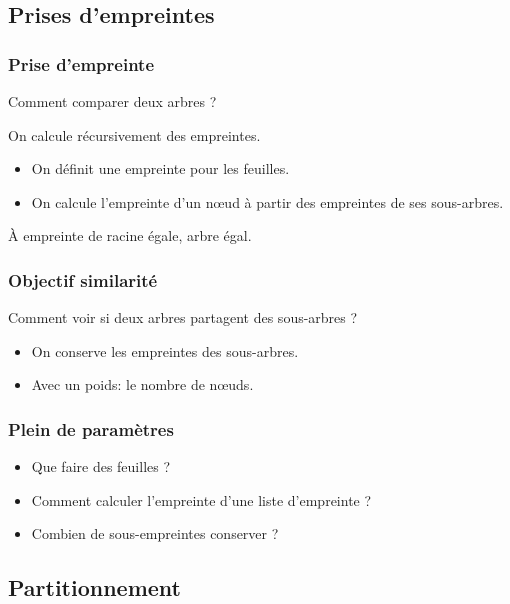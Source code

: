 \documentclass[11pt]{beamer}
\begin{document}
\subsection{Prises d'empreintes}
\begin{frame}
	\frametitle{Prise d'empreinte}
	Comment comparer deux arbres ?
	
	\pause
	
	On calcule \alert{récursivement} des empreintes.
	\pause
	
	\begin{itemize}
		\item On définit une empreinte pour les feuilles.
		\item On calcule l'empreinte d'un nœud à partir des empreintes de ses sous-arbres.
	\end{itemize}
	
	\pause
	À empreinte de racine égale, arbre égal.
	
\end{frame}

\begin{frame}
	\frametitle{Objectif similarité}
	Comment voir si deux arbres partagent des sous-arbres ?
	
	\begin{itemize}
		\item On conserve les empreintes des sous-arbres.
		\item Avec un poids: le nombre de nœuds.
	\end{itemize}
\end{frame}

\begin{frame}
	\frametitle{Plein de paramètres}
	
	\begin{itemize}
		\item Que faire des feuilles ?
		\item Comment calculer l'empreinte d'une liste d'empreinte ?
		\item Combien de sous-empreintes conserver ?
	\end{itemize}
\end{frame}

\subsection{Partitionnement}
\end{document}

